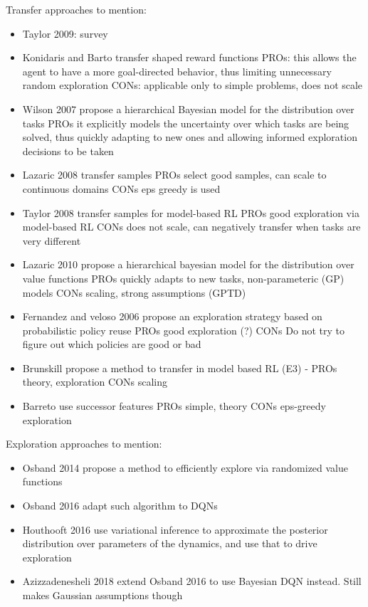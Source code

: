 \documentclass{article}
\begin{document}
Transfer approaches to mention:
\begin{itemize}
\item Taylor 2009: survey
\item Konidaris and Barto transfer shaped reward functions PROs: this allows the agent to have a more goal-directed behavior, thus limiting unnecessary random exploration CONs: applicable only to simple problems, does not scale
\item Wilson 2007 propose a hierarchical Bayesian model for the distribution over tasks PROs it explicitly models the uncertainty over which tasks are being solved, thus quickly adapting to new ones and allowing informed exploration decisions to be taken
\item Lazaric 2008 transfer samples PROs select good samples, can scale to continuous domains CONs eps greedy is used
\item Taylor 2008 transfer samples for model-based RL PROs good exploration via model-based RL CONs does not scale, can negatively transfer when tasks are very different
\item Lazaric 2010 propose a hierarchical bayesian model for the distribution over value functions PROs quickly adapts to new tasks, non-parameteric (GP) models CONs scaling, strong assumptions (GPTD)
\item Fernandez and veloso 2006 propose an exploration strategy based on probabilistic policy reuse PROs good exploration (?) CONs Do not try to figure out which policies are good or bad
\item Brunskill propose a method to transfer in model based RL (E3) - PROs theory, exploration CONs scaling
\item Barreto use successor features PROs simple, theory CONs eps-greedy exploration
\end{itemize}

Exploration approaches to mention:
\begin{itemize}
\item Osband 2014 propose a method to efficiently explore via randomized value functions
\item Osband 2016 adapt such algorithm to DQNs
\item Houthooft 2016 use variational inference to approximate the posterior distribution over parameters of the dynamics, and use that to drive exploration
\item Azizzadenesheli 2018 extend Osband 2016 to use Bayesian DQN instead. Still makes Gaussian assumptions though
\end{itemize}
\end{document}
